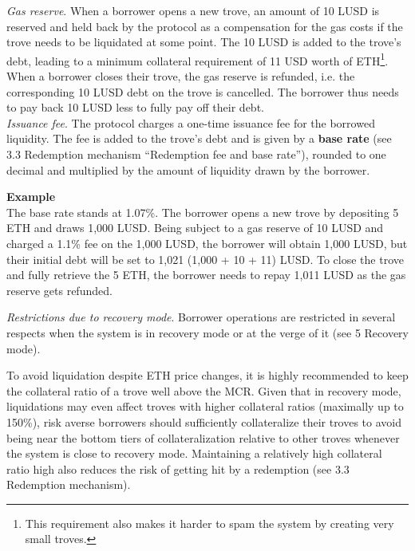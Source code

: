 \documentclass{article}
\begin{document}
\textit{Gas reserve}. When a borrower opens a new trove, an amount of 10 LUSD is reserved and held back by the protocol as a compensation for the gas costs if the trove needs to be liquidated at some point. The 10 LUSD is added to the trove's debt, leading to a minimum collateral requirement of 11 USD worth of ETH\footnote{This requirement also makes it harder to spam the system by creating very small troves.}. When a borrower closes their trove, the gas reserve is refunded, i.e. the corresponding 10 LUSD debt on the trove is cancelled. The borrower thus needs to pay back 10 LUSD less to fully pay off their debt. \\

\textit{Issuance fee}.   The protocol charges a one-time issuance fee for the borrowed liquidity. The fee is added to the trove's debt and is given by a \textbf{base rate} (see 3.3 Redemption mechanism “Redemption fee and base rate”), rounded to one decimal and multiplied by the amount of liquidity drawn by the borrower.\\

\begin{tcolorbox}
\textbf{Example}\\
The base rate stands at 1.07\%. The borrower opens a new trove by depositing 5 ETH and draws 1,000 LUSD. Being subject to a gas reserve of 10 LUSD and charged a 1.1\% fee on the 1,000 LUSD, the borrower will obtain 1,000 LUSD, but their initial debt will be set to 1,021 (1,000 + 10 + 11) LUSD. To close the trove and fully retrieve the 5 ETH, the borrower needs to repay 1,011 LUSD as the gas reserve gets refunded.
\end{tcolorbox}

\textit{Restrictions due to recovery mode}.   Borrower operations are restricted in several respects when the system is in recovery mode or at the verge of it (see 5 Recovery mode). 

To avoid liquidation despite ETH price changes, it is highly recommended to keep the collateral ratio of a trove well above the MCR. Given that in recovery mode, liquidations may even affect troves with higher collateral ratios (maximally up to 150\%), risk averse borrowers should sufficiently collateralize their troves to avoid being near the bottom tiers of collateralization relative to other troves whenever the system is close to recovery mode. Maintaining a relatively high collateral ratio high also reduces the risk of getting hit by a redemption (see 3.3 Redemption mechanism).
\end{document}
